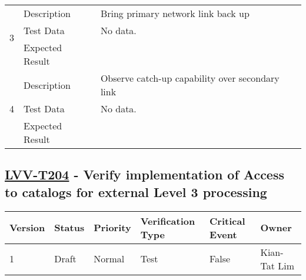 \begin{longtable}[]{p{1.3cm}p{2cm}p{13cm}}
            \multirow{3}{*}{ 3 } & Description &
            \begin{minipage}[t]{13cm}{\footnotesize
            Bring primary network link back up

            \vspace{\dp0}
            } \end{minipage} \\ \cline{2-3}
            & Test Data &
            \begin{minipage}[t]{13cm}{\footnotesize
                No data.
                \vspace{\dp0}
            } \end{minipage} \\ \cline{2-3}
            & Expected Result &
        \\ \midrule

            \multirow{3}{*}{ 4 } & Description &
            \begin{minipage}[t]{13cm}{\footnotesize
            Observe catch-up capability over secondary link

            \vspace{\dp0}
            } \end{minipage} \\ \cline{2-3}
            & Test Data &
            \begin{minipage}[t]{13cm}{\footnotesize
                No data.
                \vspace{\dp0}
            } \end{minipage} \\ \cline{2-3}
            & Expected Result &
        \\ \midrule
    \end{longtable}

\subsection{\href{https://jira.lsstcorp.org/secure/Tests.jspa\#/testCase/LVV-T204}{LVV-T204}
    - Verify implementation of Access to catalogs for external Level 3 processing}\label{lvv-t204}

\begin{longtable}[]{llllll}
\toprule
Version & Status & Priority & Verification Type & Critical Event & Owner
\\\midrule
1 & Draft & Normal &
Test & False & Kian-Tat Lim
\\\bottomrule
\end{longtable}

